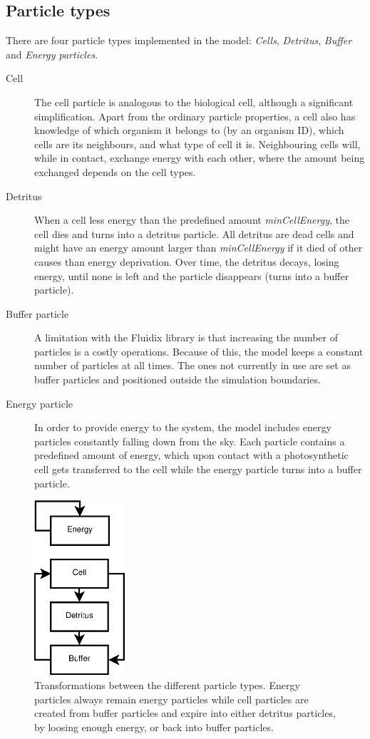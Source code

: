 \subsection{Particle types} \label{subsec:particleTypes}
There are four particle types implemented in the model: \emph{Cells}, \emph{Detritus}, \emph{Buffer} and \emph{Energy particles}.
\begin{description}
    \item [Cell] The cell particle is analogous to the biological cell, although a significant simplification. Apart from the ordinary particle properties, a cell also has knowledge of which organism it belongs to (by an organism ID), which cells are its neighbours, and what type of cell it is. Neighbouring cells will, while in contact, exchange energy with each other, where the amount being exchanged depends on the cell types.
    \item [Detritus] When a cell less energy than the predefined amount \emph{minCellEnergy}, the cell dies and turns into a detritus particle. All detritus are dead cells and might have an energy amount larger than \emph{minCellEnergy} if it died of other causes than energy deprivation. Over time, the detritus decays, losing energy, until none is left and the particle disappears (turns into a buffer particle).
    \item [Buffer particle] A limitation with the Fluidix library is that increasing the number of particles is a costly operations. Because of this, the model keeps a constant number of particles at all times. The ones not currently in use are set as buffer particles and positioned outside the simulation boundaries. 
    \item [Energy particle] In order to provide energy to the system, the model includes energy particles constantly falling down from the sky. Each particle contains a predefined amount of energy, which upon contact with a photosynthetic cell gets transferred to the cell while the energy particle turns into a buffer particle.
\end{description}
\begin{figure}
  \centering
  \includegraphics[width=0.3\textwidth]{"figure/particle cycle"}
  \caption{Transformations between the different particle types. Energy particles always remain energy particles while cell particles are created from buffer particles and expire into either detritus particles, by loosing enough energy, or back into buffer particles.} \label{fig:particleCycle} 
\end{figure}

